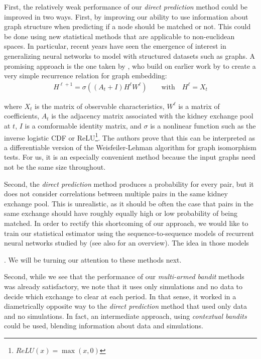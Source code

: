 \begin{itemize}
First, the relatively weak performance of our \emph{direct prediction} method could be improved in two ways. First, by improving our ability to use information about graph structure when predicting if a node should be matched or not. This could be done using new statistical methods that are applicable to non-euclidean spaces\citep{shuman2013emerging}. In particular, recent years have seen the emergence of interest in generalizing neural networks to model with structured datasets such as graphs. A promising approach is the one taken by \cite{kipf2016semi}, who build on earlier work by \cite{defferrard2016convolutional} to create a very simple recurrence relation for graph embedding:
\begin{align}
  H^{\ell + 1} = \sigma((A_{t} + I) H^{\ell}W^{\ell}) \qquad \text{with} \quad H^{\ell} = X_{t}
\end{align}

\noindent where $X_{t}$ is the matrix of observable characteristics, $W^{\ell}$ is a matrix of coefficients, $A_{t}$ is the adjacency matrix associated with the kidney exchange pool at $t$, $I$ is a comformable identity matrix, and $\sigma$ is a nonlinear function such as the inverse logistic CDF or ReLU\footnote{$ReLU(x) = \max(x, 0)$}. The authors prove that this can be interpreted as a differentiable version of the Weisfeiler-Lehman algorithm for graph isomorphism tests. For us, it is an especially convenient method because the input graphs need not be the same size throughout. 


Second, the \emph{direct prediction} method produces a probability for every pair, but it does not consider correlations between multiple pairs in the same kidney exchange pool. This is unrealistic, as it should be often the case that pairs in the same exchange should have roughly equally high or low probability of being matched. In order to rectify this shortcoming of our approach, we would like to train our statistical estimator using the sequence-to-sequence models of recurrent neural networks studied by \cite{sutskever2014sequence} (see also  \citep{lecun2015deep} for an overview). The idea in those models 


. We will be turning our attention to these methods next.

Second, while we see that the performance of our \emph{multi-armed bandit} methods was already satisfactory, we note that it uses only simulations and no data to decide which exchange to clear at each period. In that sense, it worked in a diametrically opposite way to the \emph{direct prediction} method that used only data and no simulations. In fact, an intermediate approach, using \emph{contextual bandits} \citep{lattimore2018bandits} could be used, blending information about data and simulations.


\end{itemize}
